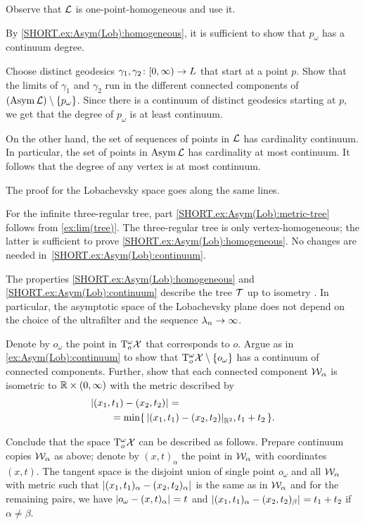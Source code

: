  Observe that $\mathcal{L}$ is one-point-homogeneous and use it.

By \ref{SHORT.ex:Asym(Lob):homogeneous}, it is sufficient to show that $p_\omega$ has a continuum degree.

Choose distinct geodesics $\gamma_1,\gamma_2\:[0,\infty)\z\to L$ that start at a point $p$.
Show that the limits of $\gamma_1$ and $\gamma_2$ run in the different connected components of $(\mathop{\rm Asym}\nolimits\mathcal{L})\setminus \{p_\omega\}$.
Since there is a continuum of distinct geodesics starting at $p$,
we get that the degree of $p_\omega$ is at least continuum.

On the other hand, the set of sequences of points in $\mathcal{L}$  has cardinality continuum.
In particular, the set of points in $\mathop{\rm Asym}\nolimits\mathcal{L}$ has cardinality at most continuum.
It follows that the degree of any vertex is at most continuum.

The proof for the Lobachevsky space goes along the same lines.

For the infinite three-regular tree, part \ref{SHORT.ex:Asym(Lob):metric-tree} follows from \ref{ex:lim(tree)}.
The three-regular tree is only vertex-homogeneous; the latter is sufficient to prove \ref{SHORT.ex:Asym(Lob):homogeneous}.
No changes are needed in~\ref{SHORT.ex:Asym(Lob):continuum}.

The properties \ref{SHORT.ex:Asym(Lob):homogeneous} and \ref{SHORT.ex:Asym(Lob):continuum} describe the tree $\mathcal{T}$ up to isometry \cite{dyubina-polterovich}.
In particular, the asymptotic space of the Lobachevsky plane does not depend on the choice of the ultrafilter and the sequence $\lambda_n\z\to \infty$.


Denote by $o_\omega$ the point in $\mathrm{T}^\omega_o\mathcal{X}$ that corresponds to $o$.
Argue as in \ref{ex:Asym(Lob):continuum} to show that $\mathrm{T}^\omega_o\mathcal{X}\setminus \{o_\omega\}$ has a continuum of connected components.
Further, show that each connected component $\mathcal{W}_\alpha$ is isometric to $\mathbb{R}\times (0,\infty)$ with the metric described by
\begin{align*}
&\dist{(x_1,t_1)}{(x_2,t_2)}{}=
\\
&\qquad=\min\{\,\dist{(x_1,t_1)}{(x_2,t_2)}{\RR^2},t_1+t_2\,\}.
\end{align*}

Conclude that the space $\mathrm{T}^\omega_o\mathcal{X}$ can be described as follows.
Prepare continuum copies $\mathcal{W}_\alpha$ as above;
denote by $(x,t)_\alpha$ the point in $\mathcal{W}_\alpha$ with coordinates $(x,t)$.
The tangent space is the disjoint union of single point $o_\omega$ and all $\mathcal{W}_\alpha$ with metric
such that $\dist{(x_1,t_1)_\alpha}{(x_2,t_2)_\alpha}{}$ is the same as in $\mathcal{W}_\alpha$ and for the remaining pairs, we have $\dist{o_\omega}{(x,t)_\alpha}{}=t$ and $\dist{(x_1,t_1)_\alpha}{(x_2,t_2)_\beta}{}=t_1+t_2$
if $\alpha\ne\beta$.
